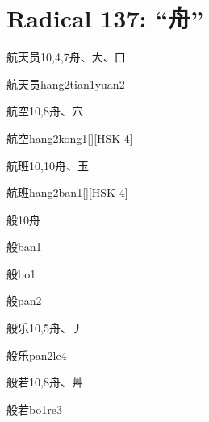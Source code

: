 
\section*{Radical 137: ``⾈''}

\begin{entry}{航天员}{10,4,7}{⾈、⼤、⼝}
  \begin{phonetics}{航天员}{hang2tian1yuan2}
  \end{phonetics}
\end{entry}

\begin{entry}{航空}{10,8}{⾈、⽳}
  \begin{phonetics}{航空}{hang2kong1}[][HSK 4]
  \end{phonetics}
\end{entry}

\begin{entry}{航班}{10,10}{⾈、⽟}
  \begin{phonetics}{航班}{hang2ban1}[][HSK 4]
  \end{phonetics}
\end{entry}

\begin{entry}{般}{10}{⾈}
  \begin{phonetics}{般}{ban1}
  \end{phonetics}
  \begin{phonetics}{般}{bo1}
  \end{phonetics}
  \begin{phonetics}{般}{pan2}
  \end{phonetics}
\end{entry}

\begin{entry}{般乐}{10,5}{⾈、⼃}
  \begin{phonetics}{般乐}{pan2le4}
  \end{phonetics}
\end{entry}

\begin{entry}{般若}{10,8}{⾈、⾋}
  \begin{phonetics}{般若}{bo1re3}
  \end{phonetics}
\end{entry}

